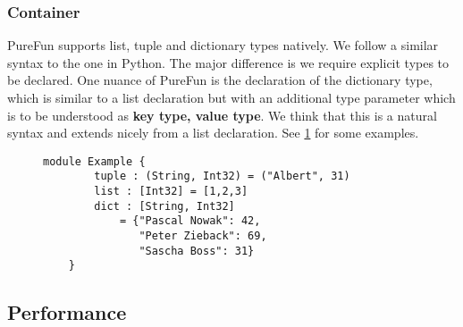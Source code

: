 \subsubsection{Container} PureFun supports list, tuple and dictionary types natively. We follow a similar syntax to the one in Python. The major difference is we require explicit types to be declared. One nuance of PureFun is the declaration of the dictionary type, which is similar to a list declaration but with an additional type parameter which is to be understood as \textbf{key type, value type}. We think that this is a natural syntax and extends nicely from a list declaration. See \ref{lst:cont} for some examples.

\begin{figure}
	\label{lst:cont}\begin{lstlisting}[caption={Some examples of container types supported in PureFun.}]
	module Example {
		tuple : (String, Int32) = ("Albert", 31)
		list : [Int32] = [1,2,3]
		dict : [String, Int32] 
			= {"Pascal Nowak": 42,
			   "Peter Zieback": 69,
			   "Sascha Boss": 31}
	}
	\end{lstlisting}
\end{figure}

\subsection{Performance}
